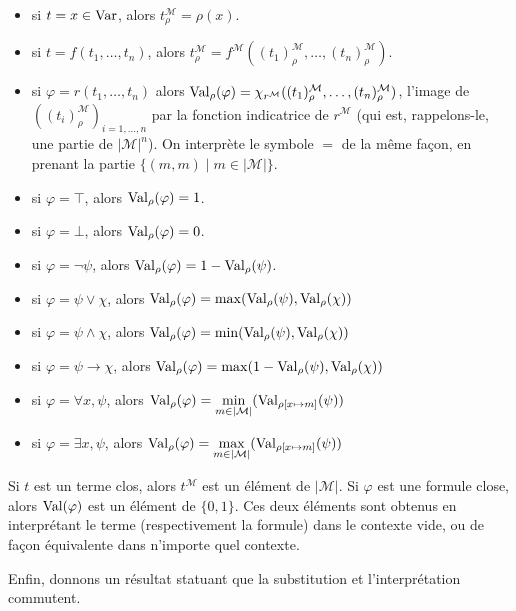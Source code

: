 \begin{definition}
  \begin{itemize}
  \item si $t = x \in \operatorname{Var}$, alors $t^\mathcal M_\rho = \rho(x)$.
  \item si $t = f(t_1,\ldots,t_n)$, alors
    $t_\rho^\mathcal M =
    f^\mathcal M((t_1)^\mathcal M_\rho,\ldots,(t_n)^\mathcal M_\rho)$.
  \item si $\varphi = r(t_1,\ldots,t_n)$ alors
    $\operatorname{Val}_\rho(\varphi) =
    \chi_{r^\mathcal M}((t_1)^\mathcal M_\rho,\ldots,(t_n)^\mathcal M_\rho)$, l'image
    de $((t_i)^\mathcal M_\rho)_{i = 1,\ldots,n}$ par la fonction indicatrice de
    $r^{\mathcal M}$ (qui est, rappelons-le, une partie de $|\mathcal M|^n$).
    On interprète le symbole $=$ de la même façon, en prenant la partie
    $\{(m,m)\mid m\in |\mathcal M|\}$.
  \item si $\varphi = \top$, alors $\operatorname{Val}_\rho(\varphi) = 1$.
  \item si $\varphi = \bot$, alors $\operatorname{Val}_\rho(\varphi) = 0$.
  \item si $\varphi = \lnot \psi$, alors
    $\operatorname{Val}_\rho(\varphi) = 1 - \operatorname{Val}_\rho(\psi)$.
  \item si $\varphi = \psi \lor \chi$, alors
    $\operatorname{Val}_\rho(\varphi) = \max(\operatorname{Val}_\rho(\psi),\operatorname{Val}_\rho(\chi))$
  \item si $\varphi = \psi \land \chi$, alors
    $\operatorname{Val}_\rho(\varphi) = \min(\operatorname{Val}_\rho(\psi),\operatorname{Val}_\rho(\chi))$
  \item si $\varphi = \psi \to \chi$, alors
    $\operatorname{Val}_\rho(\varphi) = \max(1 - \operatorname{Val}_\rho(\psi),\operatorname{Val}_\rho(\chi))$
  \item si $\varphi = \forall x, \psi$, alors
    $\displaystyle\operatorname{Val}_\rho(\varphi) =
    \min_{m \in |\mathcal M|}(\operatorname{Val}_{\rho[x\mapsto m]}(\psi))$
  \item si $\varphi = \exists x, \psi$, alors
    $\displaystyle\operatorname{Val}_\rho(\varphi) =
    \max_{m \in |\mathcal M|}(\operatorname{Val}_{\rho[x\mapsto m]}(\psi))$
  \end{itemize}
  
  Si $t$ est un terme clos, alors $t^{\mathcal M}$ est un élément de
  $|\mathcal M|$. Si $\varphi$ est une formule close, alors $\operatorname{Val}(\varphi)$ est
  un élément de $\{0,1\}$. Ces deux éléments sont obtenus en interprétant le
  terme (respectivement la formule) dans le contexte vide, ou de façon
  équivalente dans n'importe quel contexte.
\end{definition}

Enfin, donnons un résultat statuant que la substitution et l'interprétation
commutent.

